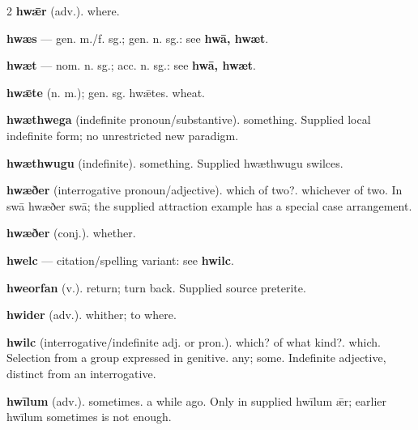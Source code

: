 \begin{multicols*}{2}
\textbf{hwǣr} (adv.). where.\par
\textbf{hwæs} — gen. m./f. sg.; gen. n. sg.: see \textbf{hwā, hwæt}.\par
\textbf{hwæt} — nom. n. sg.; acc. n. sg.: see \textbf{hwā, hwæt}.\par
\textbf{hwǣte} (n. m.); gen. sg. hwǣtes. wheat.\par
\textbf{hwæthwega} (indefinite pronoun/substantive). something. Supplied local indefinite form; no unrestricted new paradigm.\par
\textbf{hwæthwugu} (indefinite). something. Supplied hwæthwugu swilces.\par
\textbf{hwæðer} (interrogative pronoun/adjective). which of two?. whichever of two. In swā hwæðer swā; the supplied attraction example has a special case arrangement.\par
\textbf{hwæðer} (conj.). whether.\par
\textbf{hwelc} — citation/spelling variant: see \textbf{hwilc}.\par
\textbf{hweorfan} (v.). return; turn back. Supplied source preterite.\par
\textbf{hwider} (adv.). whither; to where.\par
\textbf{hwilc} (interrogative/indefinite adj. or pron.). which? of what kind?. which. Selection from a group expressed in genitive. any; some. Indefinite adjective, distinct from an interrogative.\par
\textbf{hwīlum} (adv.). sometimes. a while ago. Only in supplied hwīlum ǣr; earlier hwīlum sometimes is not enough.\par

\end{multicols*}
